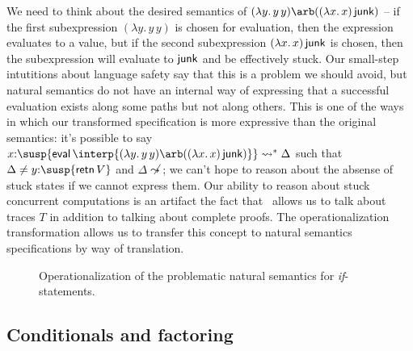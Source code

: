 We need to think about the desired semantics of $(\lambda y.\,y\,y)
\arb ((\lambda x.\,x)\,{\sf junk})$ -- if the first subexpression
$(\lambda y.\,y\,y)$ is chosen for evaluation, then the expression
evaluates to a value, but if the second subexpression $(\lambda
x.\,x)\,{\sf junk}$ is chosen, then the subexpression will evaluate to
${\sf junk}$ and be effectively stuck. Our small-step intutitions
about language safety say that this is a problem we should avoid, but
natural semantics do not have an internal way of expressing that a
successful evaluation exists along some paths but not along others.
This is one of the ways in which our transformed specification is more
expressive than the original semantics: it's possible to say
$x{:}\susp{{\sf eval}\,\interp{(\lambda y.\,y\,y) \arb ((\lambda
    x.\,x)\,{\sf junk})}} \leadsto^* \Delta$ such that $\Delta \neq
y{:}\susp{{\sf retn}\,V}$ and $\Delta \not\leadsto$; we can't hope to
reason about the absense of stuck states if we cannot express
them. Our ability to reason about stuck concurrent computations is an
artifact the fact that \sls~allows us to talk about traces $T$ in
addition to talking about complete proofs.  The operationalization
transformation allows us to transfer this concept to natural semantics
specifications by way of translation.

\begin{figure}[t]
\caption{Operationalization of the problematic natural semantics for {\it if}-statements.}
\label{fig:sls-bad-ite}
\end{figure}

\subsection{Conditionals and factoring}

